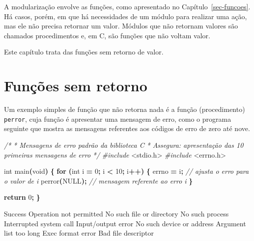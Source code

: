 \documentclass[
  11pt,
  a4paper,
]{scrbook}
\newenvironment{Shaded}{\begin{snugshade}}{\end{snugshade}}
\newcommand{\CommentTok}[1]{\textcolor[rgb]{0.56,0.35,0.01}{\textit{#1}}}
\newcommand{\ControlFlowTok}[1]{\textcolor[rgb]{0.13,0.29,0.53}{\textbf{#1}}}
\newcommand{\DataTypeTok}[1]{\textcolor[rgb]{0.13,0.29,0.53}{#1}}
\newcommand{\DecValTok}[1]{\textcolor[rgb]{0.00,0.00,0.81}{#1}}
\newcommand{\ImportTok}[1]{#1}
\newcommand{\NormalTok}[1]{#1}
\newcommand{\OperatorTok}[1]{\textcolor[rgb]{0.81,0.36,0.00}{\textbf{#1}}}
\newcommand{\PreprocessorTok}[1]{\textcolor[rgb]{0.56,0.35,0.01}{\textit{#1}}}
\begin{document}
A modularização envolve as funções, como apresentado no
Capítulo~\ref{sec-funcoes}. Há casos, porém, em que há necessidades de
um módulo para realizar uma ação, mas ele não precisa retornar um valor.
Módulos que não retornam valores são chamados procedimentos e, em C, são
funções que não voltam valor.

Este capítulo trata das funções sem retorno de valor.

\section{Funções sem retorno}\label{funuxe7uxf5es-sem-retorno}

Um exemplo simples de função que não retorna nada é a função
(procedimento) \texttt{perror}, cuja função é apresentar uma mensagem de
erro, como o programa seguinte que mostra as mensagens referentes aos
códigos de erro de zero até nove.

\begin{Shaded}
\begin{Highlighting}[]
\CommentTok{/*}
\CommentTok{ * Mensagens de erro padrão da biblioteca C}
\CommentTok{ * Assegura: apresentação das 10 primeiras mensagens de erro}
\CommentTok{ */}
\PreprocessorTok{\#include }\ImportTok{\textless{}stdio.h\textgreater{}}
\PreprocessorTok{\#include }\ImportTok{\textless{}errno.h\textgreater{}}

\DataTypeTok{int}\NormalTok{ main}\OperatorTok{(}\DataTypeTok{void}\OperatorTok{)} \OperatorTok{\{}
    \ControlFlowTok{for} \OperatorTok{(}\DataTypeTok{int}\NormalTok{ i }\OperatorTok{=} \DecValTok{0}\OperatorTok{;}\NormalTok{ i }\OperatorTok{\textless{}} \DecValTok{10}\OperatorTok{;}\NormalTok{ i}\OperatorTok{++)} \OperatorTok{\{}
\NormalTok{        errno }\OperatorTok{=}\NormalTok{ i}\OperatorTok{;}  \CommentTok{// ajusta o erro para o valor de i}
\NormalTok{        perror}\OperatorTok{(}\NormalTok{NULL}\OperatorTok{);}  \CommentTok{// mensagem referente ao erro i}
    \OperatorTok{\}}

    \ControlFlowTok{return} \DecValTok{0}\OperatorTok{;}
\OperatorTok{\}}
\end{Highlighting}
\end{Shaded}

\begin{Shaded}
\begin{Highlighting}[]
\NormalTok{Success}
\NormalTok{Operation not permitted}
\NormalTok{No such file or directory}
\NormalTok{No such process}
\NormalTok{Interrupted system call}
\NormalTok{Input/output error}
\NormalTok{No such device or address}
\NormalTok{Argument list too long}
\NormalTok{Exec format error}
\NormalTok{Bad file descriptor}
\end{Highlighting}
\end{Shaded}
\end{document}
